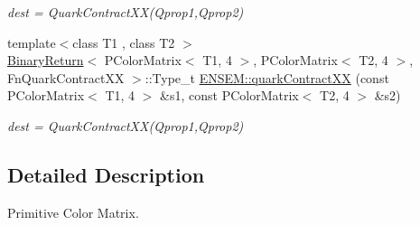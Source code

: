 \begin{DoxyCompactItemize}
\begin{DoxyCompactList}\small\item\em dest = Quark\+Contract\+X\+X(\+Qprop1,\+Qprop2) \end{DoxyCompactList}\item 
{\footnotesize template$<$class T1 , class T2 $>$ }\\\mbox{\hyperlink{structBinaryReturn}{Binary\+Return}}$<$ P\+Color\+Matrix$<$ T1, 4 $>$, P\+Color\+Matrix$<$ T2, 4 $>$, Fn\+Quark\+Contract\+XX $>$\+::Type\+\_\+t \mbox{\hyperlink{group__primcolormatrix_ga8f56e6d4ff1d01fb47481eb16006efa7}{E\+N\+S\+E\+M\+::quark\+Contract\+XX}} (const P\+Color\+Matrix$<$ T1, 4 $>$ \&s1, const P\+Color\+Matrix$<$ T2, 4 $>$ \&s2)
\begin{DoxyCompactList}\small\item\em dest = Quark\+Contract\+X\+X(\+Qprop1,\+Qprop2) \end{DoxyCompactList}\end{DoxyCompactItemize}


\subsection{Detailed Description}
Primitive Color Matrix. 


